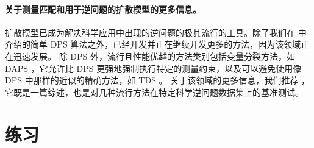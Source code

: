 \documentclass[../../book-main.tex]{subfiles}
\begin{document}
\paragraph{关于测量匹配和用于逆问题的扩散模型的更多信息。}

扩散模型已成为解决科学应用中出现的逆问题的极其流行的工具。除了我们在  中介绍的简单 DPS 算法之外，已经开发并正在继续开发更多的方法，因为该领域正在迅速发展。
除 DPS 外，流行且性能优越的方法类别包括变量分裂方法，如 DAPS \cite{Zhang2024-ha}，它允许比 DPS 更强地强制执行特定的测量约束，以及可以避免使用像 DPS 中那样的近似的精确方法，如 TDS \cite{wu2023practical}。
关于该领域的更多信息，我们推荐 \cite{zheng2025inversebench}，它既是一篇综述，也是对几种流行方法在特定科学逆问题数据集上的基准测试。

\section{练习}
\end{document}
